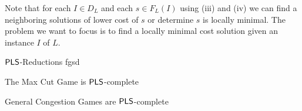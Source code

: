 Note that for each $I\in D_L$ and each $s\in F_L(I)$ using (iii) and (iv) we can find a neighboring solutions of lower cost of $s$ or determine $s$ is locally minimal. The problem we want to focus is to find a locally minimal cost solution given an instance $I$ of $L$.

\begin{definition}{$\operatorname{\mathsf{PLS}}$-Reductions}{}
	fgsd
\end{definition}
\begin{Theorem}{}{}
	The Max Cut Game is $\operatorname{\mathsf{PLS}}$-complete
\end{Theorem}

\begin{Theorem}{}{}
	General Congestion Games are $\operatorname{\mathsf{PLS}}$-complete
\end{Theorem}